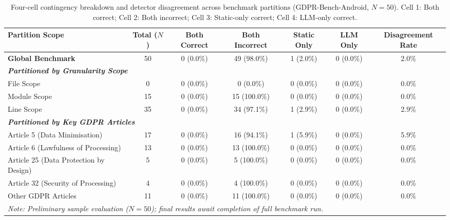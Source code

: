\begin{table}[t]
\centering
\caption{Four-cell contingency breakdown and detector disagreement across benchmark partitions (GDPR-Bench-Android, $N=50$). Cell 1: Both correct; Cell 2: Both incorrect; Cell 3: Static-only correct; Cell 4: LLM-only correct.}
\label{tab:complementarity_matrix}
\small
\begin{tabular}{lcccccc}
\toprule
\textbf{Partition Scope} & \textbf{Total ($N$)} & \textbf{Both Correct} & \textbf{Both Incorrect} & \textbf{Static Only} & \textbf{LLM Only} & \textbf{Disagreement Rate} \\
\midrule
\textbf{Global Benchmark} & 50 & 0 (0.0\%) & 49 (98.0\%) & 1 (2.0\%) & 0 (0.0\%) & 2.0\% \\
\midrule
\multicolumn{7}{l}{\textit{\textbf{Partitioned by Granularity Scope}}} \\
  File Scope & 0 & 0 (0.0\%) & 0 (0.0\%) & 0 (0.0\%) & 0 (0.0\%) & 0.0\% \\
  Module Scope & 15 & 0 (0.0\%) & 15 (100.0\%) & 0 (0.0\%) & 0 (0.0\%) & 0.0\% \\
  Line Scope & 35 & 0 (0.0\%) & 34 (97.1\%) & 1 (2.9\%) & 0 (0.0\%) & 2.9\% \\
\midrule
\multicolumn{7}{l}{\textit{\textbf{Partitioned by Key GDPR Articles}}} \\
  Article 5 (Data Minimisation) & 17 & 0 (0.0\%) & 16 (94.1\%) & 1 (5.9\%) & 0 (0.0\%) & 5.9\% \\
  Article 6 (Lawfulness of Processing) & 13 & 0 (0.0\%) & 13 (100.0\%) & 0 (0.0\%) & 0 (0.0\%) & 0.0\% \\
  Article 25 (Data Protection by Design) & 5 & 0 (0.0\%) & 5 (100.0\%) & 0 (0.0\%) & 0 (0.0\%) & 0.0\% \\
  Article 32 (Security of Processing) & 4 & 0 (0.0\%) & 4 (100.0\%) & 0 (0.0\%) & 0 (0.0\%) & 0.0\% \\
  Other GDPR Articles & 11 & 0 (0.0\%) & 11 (100.0\%) & 0 (0.0\%) & 0 (0.0\%) & 0.0\% \\
\midrule
\multicolumn{7}{l}{\textit{Note: Preliminary sample evaluation ($N=50$); final results await completion of full benchmark run.}} \\
\bottomrule
\end{tabular}
\end{table}
